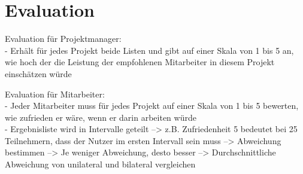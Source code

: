 \section{Evaluation}
\label{ch:methodik:evaluation}
Evaluation für Projektmanager:\\
- Erhält für jedes Projekt beide Listen und gibt auf einer Skala von 1 bis 5 an, wie hoch der die Leistung der empfohlenen Mitarbeiter in diesem Projekt einschätzen würde

Evaluation für Mitarbeiter:\\
- Jeder Mitarbeiter muss für jedes Projekt auf einer Skala von 1 bis 5 bewerten, wie zufrieden er wäre, wenn er darin arbeiten würde\\
- Ergebnisliste wird in Intervalle geteilt --> z.B. Zufriedenheit 5 bedeutet bei 25 Teilnehmern, dass der Nutzer im ersten Intervall sein muss --> Abweichung bestimmen --> Je weniger Abweichung, desto besser --> Durchschnittliche Abweichung von unilateral und bilateral vergleichen
